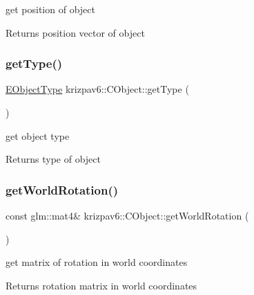 get position of object 

\begin{DoxyReturn}{Returns}
position vector of object 
\end{DoxyReturn}
\mbox{\label{classkrizpav6_1_1_c_object_a401c450df550f3bf8bc89cd7d2d87999}} 
\subsubsection{\texorpdfstring{getType()}{getType()}}
{\footnotesize\ttfamily \mbox{\hyperlink{classkrizpav6_1_1_c_object_a54fa6c9a881bd5b3e1b4bc606444997f}{E\+Object\+Type}} krizpav6\+::\+C\+Object\+::get\+Type (\begin{DoxyParamCaption}{ }\end{DoxyParamCaption})\hspace{0.3cm}{\ttfamily [inline]}}



get object type 

\begin{DoxyReturn}{Returns}
type of object 
\end{DoxyReturn}
\mbox{\label{classkrizpav6_1_1_c_object_ab78fee9210bfd1f0fc68e3d0dbba44df}} 
\subsubsection{\texorpdfstring{getWorldRotation()}{getWorldRotation()}}
{\footnotesize\ttfamily const glm\+::mat4\& krizpav6\+::\+C\+Object\+::get\+World\+Rotation (\begin{DoxyParamCaption}{ }\end{DoxyParamCaption})\hspace{0.3cm}{\ttfamily [inline]}}



get matrix of rotation in world coordinates 

\begin{DoxyReturn}{Returns}
rotation matrix in world coordinates 
\end{DoxyReturn}
\mbox{\label{classkrizpav6_1_1_c_object_a89b8ce0f8da3be70e99957510bb107b1}} 
